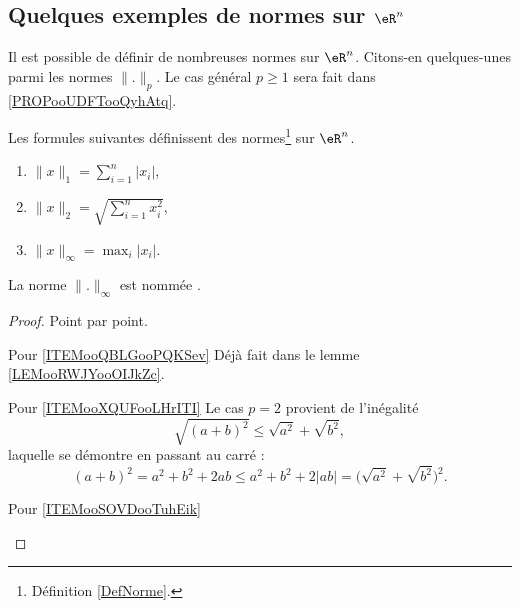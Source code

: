\subsection{Quelques exemples de normes sur \texorpdfstring{$\eR^n$}{Rn}}

Il est possible de définir de nombreuses normes sur \( \eR^n\). Citons-en quelques-unes parmi les normes \( \| . \|_p\). Le cas général \( p\geq 1\) sera fait dans \ref{PROPooUDFTooQyhAtq}.

\begin{propositionDef}      \label{PROPooCLZRooIRxCnZ}
    Les formules suivantes définissent des normes\footnote{Définition \ref{DefNorme}.} sur \( \eR^n\).
    \begin{enumerate}
        \item       \label{ITEMooQBLGooPQKSev}
            \( \| x \|_1=\sum_{i=1}^n| x_i |\),
        \item       \label{ITEMooXQUFooLHrITI}
            \( \| x \|_2=\sqrt{ \sum_{i=1}^nx_i^2 }\),
        \item       \label{ITEMooSOVDooTuhEik}
            \( \| x \|_{\infty}=\max_i| x_i |\).
    \end{enumerate}
    La norme \( \| . \|_{\infty}\) est nommée .
\end{propositionDef}

\begin{proof}
    Point par point.
    \begin{subproof}
    \item[Pour \ref{ITEMooQBLGooPQKSev}]
        Déjà fait dans le lemme \ref{LEMooRWJYooOIJkZc}.
    \item[Pour \ref{ITEMooXQUFooLHrITI}]
        Le cas \( p=2\) provient de l'inégalité
        \begin{equation}
            \sqrt{ (a+b)^2 }\leq \sqrt{ a^2 }+\sqrt{ b^2 },
        \end{equation}
        laquelle se démontre en passant au carré :
        \begin{equation}        \label{EQooRYNYooTzZpPz}
            (a+b)^2=a^2+b^2+2ab\leq a^2+b^2+2| ab |=\big( \sqrt{ a^2 }+\sqrt{ b^2 } \big)^2.
        \end{equation}
    \item[Pour \ref{ITEMooSOVDooTuhEik}]
    \end{subproof}
\end{proof}


